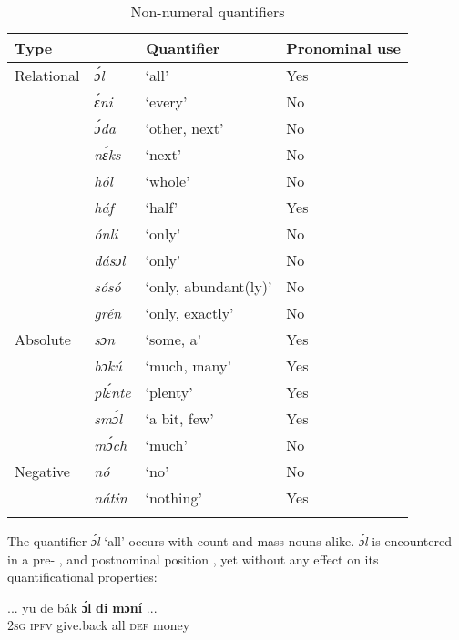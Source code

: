 \begin{table}
\caption{Non-numeral quantifiers}
\label{tab:key:5.5}

\begin{tabularx}{\textwidth}{XXll}
\lsptoprule

Type & \multicolumn{2}{c}{Quantifier} & Pronominal use\\
\midrule
Relational & \itshape ɔ́l & ‘all’ & Yes\\
& \itshape ɛ́ni & ‘every’ & No\\
& \itshape ɔ́da & ‘other, next’ & No\\
& \itshape nɛ́ks & ‘next’ & No\\
& \itshape hól & ‘whole’ & No\\
& \itshape háf & ‘half’ & Yes\\
& \itshape ónli & ‘only’ & No\\
& \itshape dásɔl & ‘only’ & No\\
& \itshape sósó & ‘only, abundant(ly)’ & No\\
& \itshape grén & ‘only, exactly’ & No\\

\tablevspace
Absolute & \itshape sɔn & ‘some, a’ & Yes\\
& \itshape bɔkú & ‘much, many’ & Yes\\
& \itshape plɛ́nte & ‘plenty’ & Yes\\
& \itshape smɔ́l & ‘a bit, few’ & Yes\\
& \itshape mɔ́ch & ‘much’ & No\\

\tablevspace
Negative & \itshape nó & ‘no’ & No\\
& \itshape nátin & ‘nothing’ & Yes\\
\lspbottomrule
\end{tabularx}
\end{table}
The quantifier \textit{ɔ́l} ‘all’ occurs with count and mass nouns alike. \textit{ɔ́l} is encountered in a pre- , and postnominal position , yet without any effect on its quantificational properties:


\ea%
    \label{ex:key:259}
    \gll \op...\cp{}  yu  de  bák      \textbf{ɔ́l}  \textbf{di}  \textbf{mɔní}  \op...\cp\\
 {} \textsc{2sg}  \textsc{ipfv}  give.back  all  \textsc{def}  money\\

